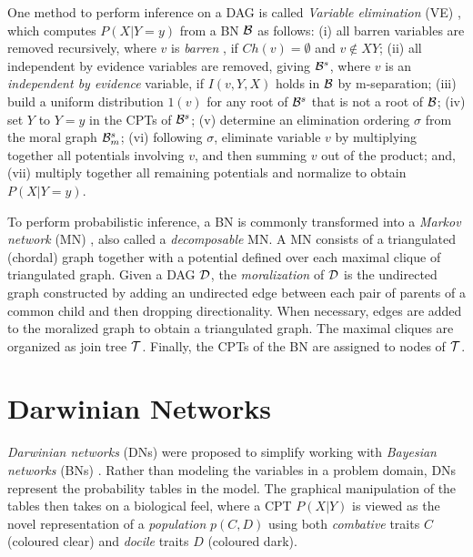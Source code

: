 One method to perform inference on a DAG is called \emph{Variable elimination} (VE) \cite{zhan94}, which computes $P(X|Y=y)$ from a BN $\cal{B}$ as follows:
(i) all barren variables are removed recursively, where $v$ is \emph{barren} \cite{zhan94}, if $Ch(v) = \emptyset$ and $v \not\in XY$;
(ii) all independent by evidence variables are removed, giving ${\cal{B}}^s$, where $v$ is an \emph{independent by evidence} variable, if $I(v,Y,X)$ holds in $\cal{B}$ by m-separation;
(iii) build a uniform distribution $1(v)$ for any root of ${\cal{B}}^s$ that is not a root of $\cal{B}$;
(iv) set $Y$ to $Y=y$ in the CPTs of ${\cal{B}}^s$;
(v) determine an elimination ordering $\sigma$ from the moral graph ${\cal{B}}^{s}_{m}$;
(vi) following $\sigma$, eliminate variable $v$ by multiplying together all potentials involving $v$, and then summing $v$ out of the product;
and, (vii) multiply together all remaining potentials and normalize to obtain $P(X|Y=y)$.


To perform probabilistic inference, a BN is commonly transformed into a \emph{Markov network} (MN) \cite{pear88}, also called a \emph{decomposable} MN. 
A MN consists of a triangulated (chordal) graph together with a potential defined over each maximal clique of triangulated graph. 
Given a DAG ${\cal D}$, the \emph{moralization} \cite{laur88} of ${\cal D}$ is the undirected graph constructed by adding an undirected edge between each pair of parents of a common child and then dropping directionality.
When necessary, edges are added to the moralized graph to obtain a triangulated graph. 
The maximal cliques are organized as join tree $\cal T$. 
Finally, the CPTs of the BN are assigned to nodes of $\cal T$. 



\section{Darwinian Networks}
\label{sec:darwinian_networks}

\emph{Darwinian networks} (DNs) \cite{butzOliveiraSantosCai15} were proposed to simplify working with \emph{Bayesian networks} (BNs) \cite{pear88}.
Rather than modeling the variables in a problem domain, DNs represent the probability tables in the model.
The graphical manipulation of the tables then takes on a biological feel, where a CPT $P(X|Y)$ is viewed as the novel representation of a \emph{population} $p(C,D)$ using both \emph{combative} traits $C$ (coloured clear) and \emph{docile} traits $D$ (coloured dark).

